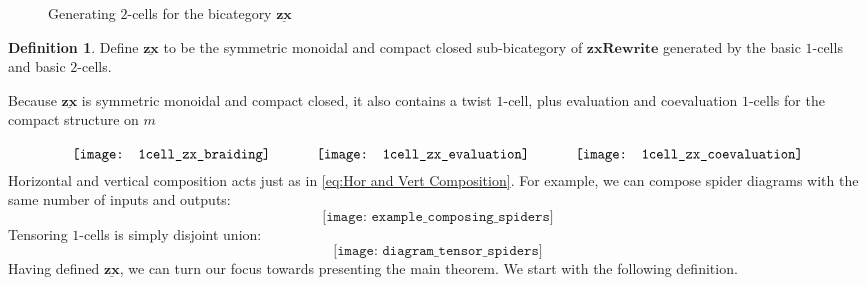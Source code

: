\documentclass[11pt]{amsart}
\newcommand{\cat}[1]{\mathbf{#1}}
\theoremstyle{remark}
\theoremstyle{definition}
\newtheorem{defn}[thm]{Definition}
\newcommand{\bicat}[1]{\underline{\mathbf{#1}}}
\begin{document}
\begin{figure}[h]
	\caption{Generating $2$-cells for the bicategory $\bicat{zx}$}
	\label{fig:ZX 2cells generators}
\end{figure}

\begin{defn}
	\label{def:zx bicat}
	Define $\bicat{zx}$ to be the symmetric monoidal and compact closed sub-bicategory of $\cat{zxRewrite}$ generated by the basic $1$-cells and basic $2$-cells.
\end{defn}

Because $\bicat{zx}$ is symmetric monoidal and compact closed, it also contains a twist $1$-cell, plus evaluation and coevaluation $1$-cells for the compact structure on $m$ 
\begin{equation}
\label{diag:TwistCompact 1cells}
\raisebox{-0.8\height}{
	\texttt{[image: 1cell\_zx\_braiding]}
	\quad \quad \quad
	\texttt{[image: 1cell\_zx\_evaluation]}
	\quad \quad \quad
	\texttt{[image: 1cell\_zx\_coevaluation]}
}
\end{equation}
Horizontal and vertical composition acts just as in \eqref{eq:Hor and Vert Composition}. For example, we can compose spider diagrams with the same number of inputs and outputs:
\[
	\texttt{[image: example\_composing\_spiders]}
\]
Tensoring $1$-cells is simply disjoint union: 
\[
	\texttt{[image: diagram\_tensor\_spiders]}
\]
Having defined $\bicat{zx}$, we can turn our focus towards presenting the main theorem. We start with the following definition.
\end{document}
